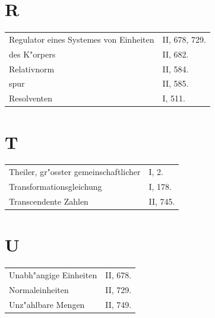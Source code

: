 \documentclass[10pt,a4paper]{article}
\theoremstyle{weberstyle}
\begin{document}
\newpage

\section*{R}
\begin{flushleft}
\begin{tabular}{@{}p{8cm}l@{}}
Regulator eines Systemes von Einheiten & II, 678, 729.\\
\quad des K"orpers & II, 682.\\[4pt]
Relativnorm & II, 584.\\
\quad spur & II, 585.\\[4pt]
Resolventen & I, 511.
\end{tabular}
\end{flushleft}

\section*{T}
\begin{flushleft}
\begin{tabular}{@{}p{8cm}l@{}}
Theiler, gr"osster gemeinschaftlicher & I, 2.\\[4pt]
Transformationsgleichung & I, 178.\\[4pt]
Transcendente Zahlen & II, 745.
\end{tabular}
\end{flushleft}

\section*{U}
\begin{flushleft}
\begin{tabular}{@{}p{8cm}l@{}}
Unabh"angige Einheiten & II, 678.\\
\quad Normaleinheiten & II, 729.\\[4pt]
Unz"ahlbare Mengen & II, 749.
\end{tabular}
\end{flushleft}
\end{document}
